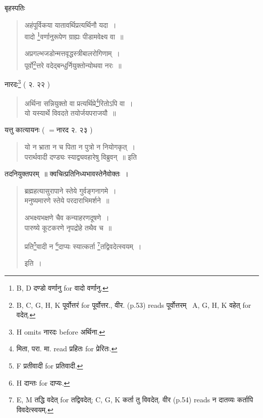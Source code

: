 \documentclass[11pt, openany]{book}
\begin{document}
\newpage
{}

बृहस्पतिः

\begin{quote}
{\vy अहंपूर्विकया यातावर्थिप्रत्यर्थिनौ यदा~।\\
वादो \renewcommand{\thefootnote}{1}\footnote{B, D दण्डो वर्णानु for वादो वर्णानु.}वर्णानुरूपेण ग्राह्यः पीडामवेक्ष्य वा~॥

अप्रगल्भजडोन्मत्तवृद्धस्त्रीबालरोगिणाम्~।\\
पूर्वो\renewcommand{\thefootnote}{2}\footnote{B, C, G, H, K पूर्वोत्तरं for पूर्वोत्तर., वीर. (p.53) reads पूर्वोत्तरम् \textendash\ A, G, H, K वहेत् for वदेत्.}त्तरे वदेद्बन्धुर्नियुक्तोन्योथवा नरः~॥}
\end{quote}

नारदः\renewcommand{\thefootnote}{3}\footnote{H omits नारदः before अर्थिना.} ( २. २२ )

\begin{quote}
{\vy अर्थिना सन्नियुक्तो वा प्रत्यर्थिप्रे\renewcommand{\thefootnote}{4}\footnote{मिता, परा. मा. read प्रहितः for प्रेरितः.}रितोऽपि वा~।\\
यो यस्यार्थे विवदते तयोर्जयपराजयौ~॥}
\end{quote}

यत्तु कात्यायनः ( $=$नारद २. २३ )

\begin{quote}
{\vy यो न भ्राता न च पिता न पुत्रो न नियोगकृत्~।\\
परार्थवादी दण्ड्यः स्याद्व्यवहारेषु विब्रुवन्~॥} इति
\end{quote}

तदनियुक्तपरम्~॥ क्वचित्प्रतिनिध्यभावस्तेनैवोक्तः~। 

\begin{quote}
{\vy ब्रह्महत्यासुरापाने स्तेये गुर्वङ्गनागमे~।\\
मनुष्यमारणे स्तेये परदाराभिमर्शने~॥

अभक्ष्यभक्षणे चैव कन्याहरणदूषणे~।\\
पारुष्ये कूटकरणे नृपद्रोहे तथैव च~॥

प्रति\renewcommand{\thefootnote}{5}\footnote{F प्रतीवादी for प्रतिवादी.}वादी न \renewcommand{\thefootnote}{6}\footnote{H दान्तः for दाप्यः.}दाप्यः स्यात्कर्ता \renewcommand{\thefootnote}{7}\footnote{E, M तद्धि वदेत् for तद्विवदेत्; C, G, K कर्ता तु विवदेत्. वीर (p.54) reads न दातव्यः कर्तापि विवदेत्स्वयम्.}तद्विवदेत्स्वयम्~।} इति~।
\end{quote}
\end{document}
